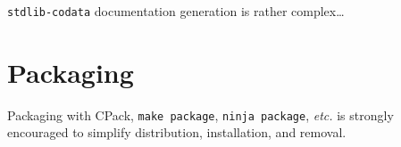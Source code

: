 \texttt{stdlib-codata} documentation generation is rather complex\ldots

\section{Packaging}

Packaging with CPack, \texttt{make package}, \texttt{ninja package},
\textit{etc.} is strongly encouraged to simplify distribution,
installation, and removal.
